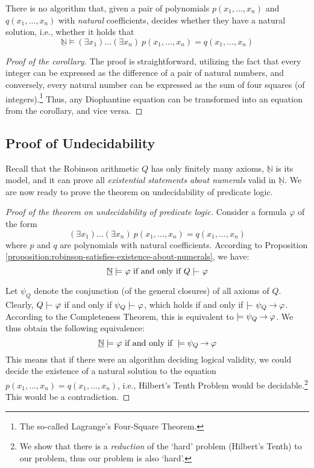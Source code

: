     \begin{corollary}
    There is no algorithm that, given a pair of polynomials $p(x_1,\dots,x_n)$ and $q(x_1,\dots,x_n)$ with \emph{natural} coefficients, decides whether they have a natural solution, i.e., whether it holds that
    $$
    \underline{\mathbb N}\models(\exists x_1)\dots(\exists x_n)\ p(x_1,\dots,x_n)=q(x_1,\dots,x_n)
    $$
    \end{corollary}
    \begin{proof}[Proof of the corollary]
    The proof is straightforward, utilizing the fact that every integer can be expressed as the difference of a pair of natural numbers, and conversely, every natural number can be expressed as the sum of four squares (of integers).\footnote{The so-called Lagrange's Four-Square Theorem.} Thus, any Diophantine equation can be transformed into an equation from the corollary, and vice versa.
    \end{proof}
    
    \subsection{Proof of Undecidability}
    
    Recall that the Robinson arithmetic $Q$ has only finitely many axioms, $\underline{\mathbb N}$ is its model, and it can prove all \emph{existential statements about numerals} valid in $\underline{\mathbb N}$. We are now ready to prove the theorem on undecidability of predicate logic.
    
    \begin{proof}[Proof of the theorem on undecidability of predicate logic]
    Consider a formula $\varphi$ of the form 
    $$(\exists x_1)\dots(\exists x_n)\ p(x_1,\dots,x_n)=q(x_1,\dots,x_n)
    $$ 
    where $p$ and $q$ are polynomials with natural coefficients. According to Proposition \ref{proposition:robinson-satisfies-existence-about-numerals}, we have:
    $$
    \underline{\mathbb N}\models \varphi\text{ if and only if }Q\proves \varphi
    $$
    
    Let $\psi_Q$ denote the conjunction (of the general closures) of all axioms of $Q$. Clearly, $Q\proves\varphi$ if and only if $\psi_Q\proves\varphi$, which holds if and only if $\proves\psi_Q\limplies\varphi$. According to the Completeness Theorem, this is equivalent to $\models\psi_Q\mathbin{\rightarrow}\varphi$. We thus obtain the following equivalence:
    $$
    \underline{\mathbb N}\models \varphi\text{ if and only if }\models \psi_Q\mathbin{\rightarrow}\varphi
    $$
    This means that if there were an algorithm deciding logical validity, we could decide the existence of a natural solution to the equation $p(x_1,\dots,x_n)=q(x_1,\dots,x_n)$, i.e., Hilbert's Tenth Problem would be decidable.\footnote{We show that there is a \emph{reduction} of the `hard' problem (Hilbert's Tenth) to our problem, thus our problem is also `hard'.} This would be a contradiction.
    \end{proof}
    
